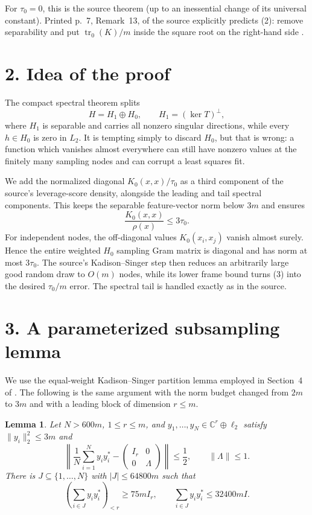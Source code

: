 \documentclass[10pt]{article}
\newtheorem{lemma}[theorem]{Lemma}
\newcommand{\C}{\mathbb C}
\newcommand{\tr}{\operatorname{tr}}
\begin{document}
For $\tau_0=0$, this is the source theorem (up to an inessential change of
its universal constant).  Printed p.~7, Remark~13, of the source explicitly
predicts (2): remove separability and put $\tr_0(K)/m$ inside the square root
on the right-hand side \cite[p.~7, Remark~13]{DKU}.

\section*{2. Idea of the proof}
The compact spectral theorem splits
\[
 H=H_1\oplus H_0,
 \qquad H_1=(\ker T)^\perp,
\]
where $H_1$ is separable and carries all nonzero singular directions, while
every $h\in H_0$ is zero in $L_2$.  It is tempting simply to discard $H_0$,
but that is wrong: a function which vanishes almost everywhere can still have
nonzero values at the finitely many sampling nodes and can corrupt a least
squares fit.

We add the normalized diagonal $K_0(x,x)/\tau_0$ as a third component of the
source's leverage-score density, alongside the leading and tail spectral
components.  This keeps the separable feature-vector norm below $3m$ and
ensures
\[
 \frac{K_0(x,x)}{\rho(x)}\leq3\tau_0.                         \tag{3}
\]
For independent nodes, the off-diagonal values $K_0(x_i,x_j)$ vanish almost
surely.  Hence the entire weighted $H_0$ sampling Gram matrix is diagonal and
has norm at most $3\tau_0$.  The source's Kadison--Singer step then reduces an
arbitrarily large good random draw to $O(m)$ nodes, while its lower frame bound
turns (3) into the desired $\tau_0/m$ error.  The spectral tail is handled
exactly as in the source.

\section*{3. A parameterized subsampling lemma}
We use the equal-weight Kadison--Singer partition lemma employed in
Section~4 of \cite{DKU}.  The following is the same argument with the norm
budget changed from $2m$ to $3m$ and with a leading block of dimension
$r\leq m$.

\begin{lemma}\label{lem:sparse}
Let $N>600m$, $1\leq r\leq m$, and
$y_1,\ldots,y_N\in\C^r\oplus\ell_2$ satisfy $\|y_i\|_2^2\leq3m$ and
\[
 \left\|\frac1N\sum_{i=1}^N y_i y_i^*
       -\begin{pmatrix}I_r&0\\0&\Lambda\end{pmatrix}\right\|
 \leq\frac12,
 \qquad \|\Lambda\|\leq1.                                  \tag{4}
\]
There is $J\subseteq\{1,\ldots,N\}$ with $|J|\leq64800m$ such that
\[
 \left(\sum_{i\in J}y_i y_i^*\right)_{<r}\geq75mI_r,
 \qquad
 \sum_{i\in J}y_i y_i^*\leq32400mI.                         \tag{5}
\]
\end{lemma}
\end{document}
